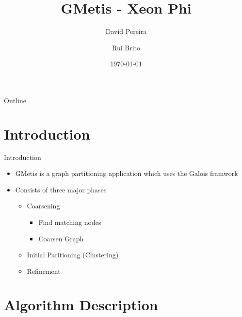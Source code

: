 \documentclass{beamer}
\title{
    GMetis - Xeon Phi
}
\author{
    David Pereira
    \and
    Rui Brito
}
\date{\today}
\begin{document}
\begin{frame}
  \titlepage
\end{frame}

\begin{frame}{Outline}
  \tableofcontents
\end{frame}



\section{Introduction}

\begin{frame}{Introduction}
\begin{itemize}
    \item GMetis is a graph partitioning application which uses the Galois
      framwork
    \item Consists of three major phases
      \begin{itemize}
        \item Coarsening
        \begin{itemize}
          \item Find matching nodes
          \item Coarsen Graph
        \end{itemize}
        \item Initial Paritioning (Clustering)
        \item Refinement
      \end{itemize}
\end{itemize}
\end{frame}



\section{Algorithm Description}
\end{document}
